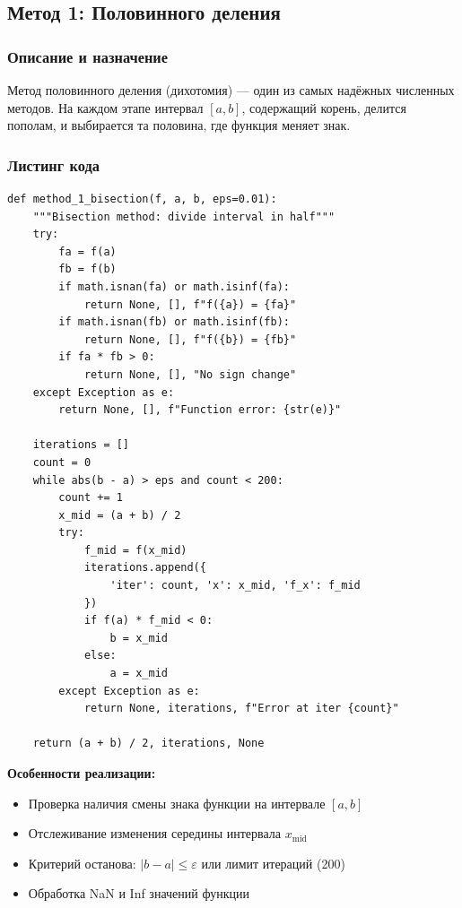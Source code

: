 \documentclass[a4paper,12pt]{article}
\begin{document}
\newpage

\subsection{Метод 1: Половинного деления}

\subsubsection*{Описание и назначение}

Метод половинного деления (дихотомия) --- один из самых надёжных численных методов. На каждом этапе интервал $[a, b]$, содержащий корень, делится пополам, и выбирается та половина, где функция меняет знак.

\subsubsection*{Листинг кода}

\begin{lstlisting}[style=intellij,caption={method\_1\_bisection()},basicstyle=\ttfamily\small\color{intj-id}]
def method_1_bisection(f, a, b, eps=0.01):
    """Bisection method: divide interval in half"""
    try:
        fa = f(a)
        fb = f(b)
        if math.isnan(fa) or math.isinf(fa):
            return None, [], f"f({a}) = {fa}"
        if math.isnan(fb) or math.isinf(fb):
            return None, [], f"f({b}) = {fb}"
        if fa * fb > 0:
            return None, [], "No sign change"
    except Exception as e:
        return None, [], f"Function error: {str(e)}"
    
    iterations = []
    count = 0
    while abs(b - a) > eps and count < 200:
        count += 1
        x_mid = (a + b) / 2
        try:
            f_mid = f(x_mid)
            iterations.append({
                'iter': count, 'x': x_mid, 'f_x': f_mid
            })
            if f(a) * f_mid < 0:
                b = x_mid
            else:
                a = x_mid
        except Exception as e:
            return None, iterations, f"Error at iter {count}"
    
    return (a + b) / 2, iterations, None
\end{lstlisting}

\textbf{Особенности реализации:}
\begin{itemize}
    \item Проверка наличия смены знака функции на интервале $[a, b]$
    \item Отслеживание изменения середины интервала $x_{\text{mid}}$
    \item Критерий останова: $|b - a| \leq \varepsilon$ или лимит итераций (200)
    \item Обработка NaN и Inf значений функции
\end{itemize}
\end{document}
